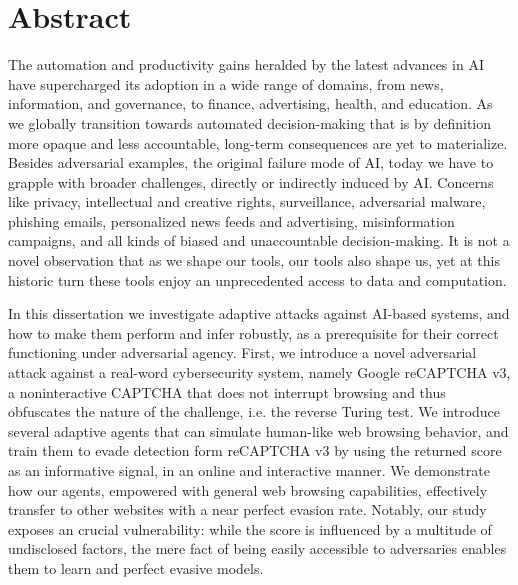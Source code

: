 \chapter{Abstract}
\label{ch:abstract}

The automation and productivity gains heralded by the latest advances in \gls{AI} have supercharged its adoption in a wide range of domains, from news, information, and governance, to finance, advertising, health, and education.
As we globally transition towards automated decision-making that is by definition more opaque and less accountable, long-term consequences are yet to materialize.
Besides adversarial examples, the original failure mode of \gls{AI}, today we have to grapple with broader challenges, directly or indirectly induced by \gls{AI}.
Concerns like privacy, intellectual and creative rights, surveillance, adversarial malware, phishing emails, personalized news feeds and advertising, misinformation campaigns, and all kinds of biased and unaccountable decision-making.
It is not a novel observation that as we shape our tools, our tools also shape us, yet at this historic turn these tools enjoy an unprecedented access to data and computation.

In this dissertation we investigate adaptive attacks against AI-based systems, and how to make them perform and infer robustly, as a prerequisite for their correct functioning under adversarial agency.
First, we introduce a novel adversarial attack against a real-word cybersecurity system, namely Google reCAPTCHA v3, a noninteractive CAPTCHA that does not interrupt browsing and thus obfuscates the nature of the challenge, i.e. the reverse Turing test.
We introduce several adaptive agents that can simulate human-like web browsing behavior, and train them to evade detection form reCAPTCHA v3 by using the returned score as an informative signal, in an online and interactive manner.
We demonstrate how our agents, empowered with general web browsing capabilities, effectively transfer to other websites with a near perfect evasion rate.
Notably, our study exposes an crucial vulnerability: while the score is influenced by a multitude of undisclosed factors, the mere fact of being easily accessible to adversaries enables them to learn and perfect evasive models.

